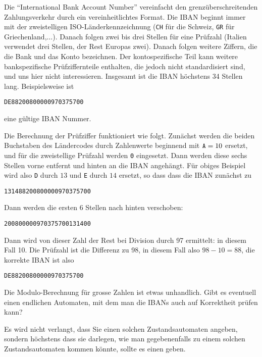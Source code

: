 Die ``International Bank Account Number'' vereinfacht den
grenzüberschreitenden Zahlungsverkehr durch ein vereinheitlichtes
Format. Die IBAN beginnt immer mit der zweistelligen ISO-Länderkennzeichnung
({\tt CH} für die Schweiz, {\tt GR} für Griechenland,$\dots$). Danach
folgen zwei bis drei Stellen für eine Prüfzahl (Italien verwendet
drei Stellen, der Rest Europas zwei).
Danach folgen weitere Ziffern, die die Bank und das Konto bezeichnen.
Der kontospezifische Teil kann weitere bankspezifische Prüfziffernteile
enthalten, die jedoch nicht standardisiert sind, und uns hier nicht
interessieren.
Insgesamt ist die IBAN höchstens 34 Stellen lang.
Beispielsweise ist
\begin{center}
{\tt DE88200800000970375700}
\end{center}
eine gültige IBAN Nummer.

Die Berechnung der Prüfziffer funktioniert wie folgt.
Zunächst
werden die beiden Buchstaben des Ländercodes durch Zahlenwerte
beginnend mit $\text{\tt A}=10$ ersetzt, und für die zweistellige
Prüfzahl werden {\tt 0} eingesetzt. Dann werden diese sechs Stellen
vorne entfernt und hinten an die IBAN angehängt. Für obiges Beispiel
wird also {\tt D} durch $13$ und {\tt E} durch $14$ ersetzt, so dass dass die 
IBAN zunächst zu
\begin{center}
{\tt 131488200800000970375700}
\end{center}
Dann werden die ersten 6 Stellen nach hinten verschoben:
\begin{center}
{\tt 200800000970375700131400}
\end{center}
Dann wird von dieser Zahl der Rest bei Division durch 97 ermittelt:
in diesem Fall 10. Die Prüfzahl ist die Differenz zu 98, in diesem
Fall also $98-10=88$, die korrekte IBAN ist also
\begin{center}
{\tt DE88200800000970375700}
\end{center}

Die Modulo-Berechnung für grosse Zahlen ist etwas unhandlich.
Gibt es eventuell einen endlichen Automaten, mit dem man die IBANs
auch auf Korrektheit prüfen kann?

\begin{hinweis}
Es wird nicht verlangt, dass Sie einen solchen Zustandsautomaten angeben,
sondern höchstens dass sie darlegen, wie man gegebenenfalls zu einem solchen
Zustandsautomaten kommen könnte, sollte es einen geben.
\end{hinweis}


